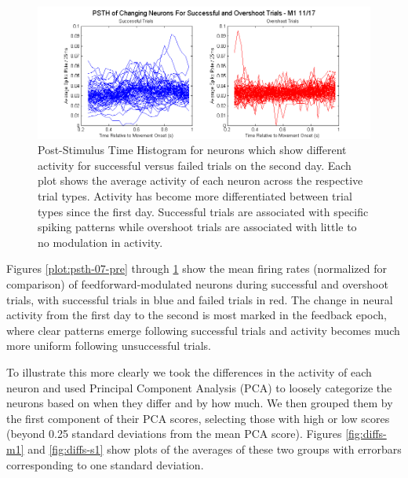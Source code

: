 \documentclass[11pt,a4paper]{article}
\begin{document}
\begin{figure}[h]
\includegraphics[width=\textwidth]{psth-s-f21-m1-17-pos}
\caption{Post-Stimulus Time Histogram for neurons which show different activity for successful versus failed trials on the second day. Each plot shows the average activity of each neuron across the respective trial types. Activity has become more differentiated between trial types since the first day. Successful trials are associated with specific spiking patterns while overshoot trials are associated with little to no modulation in activity.}\label{plot:psth-17-pos}
\end{figure}

Figures \ref{plot:psth-07-pre} through \ref{plot:psth-17-pos} show the mean firing rates (normalized for comparison) of feedforward-modulated neurons during successful and overshoot trials, with successful trials in blue and failed trials in red. The change in neural activity from the first day to the second is most marked in the feedback epoch, where clear patterns emerge following successful trials and activity becomes much more uniform following unsuccessful trials. 

To illustrate this more clearly we took the differences in the activity of each neuron and used Principal Component Analysis (PCA) to loosely categorize the neurons based on when they differ and by how much. We then grouped them by the first component of their PCA scores, selecting those with high or low scores (beyond 0.25 standard deviations from the mean PCA score). Figures \ref{fig:diffs-m1} and \ref{fig:diffs-s1} show plots of the averages of these two groups with errorbars corresponding to one standard deviation.
\end{document}
